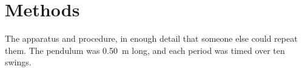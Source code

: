 \section{Methods}
\label{sec:methods}
The apparatus and procedure, in enough detail that someone else could repeat
them. The pendulum was \qty{0.50}{m} long, and each period was timed over
ten swings.
